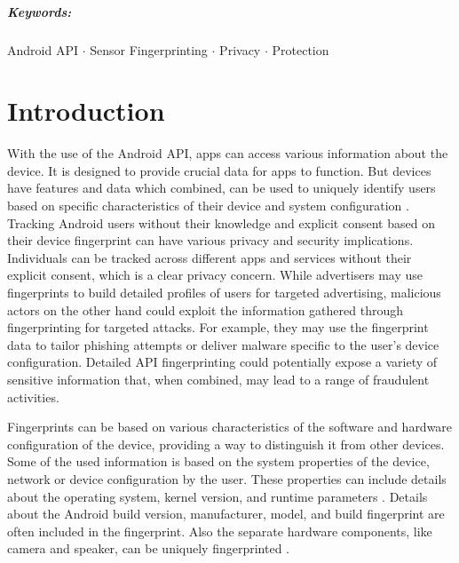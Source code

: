 \documentclass[11pt,
  oneside,openany,    %
]{scrreprt}
\begin{document}
\paragraph{Keywords:}
Android API $\cdot$
Sensor Fingerprinting $\cdot$
Privacy $\cdot$
Protection

\cleardoublepage

\chapter{Introduction}
\label{chap:introduction}

With the use of the Android API, apps can access various information about the device.
It is designed to provide crucial data for apps to function.
But devices have features and data which combined, can be used to uniquely identify users based on specific characteristics of their device and system configuration \cite{DBLP:conf/IEEEares/PalfingerP20}.
Tracking Android users without their knowledge and explicit consent based on their device fingerprint can have various privacy and security implications. 
Individuals can be tracked across different apps and services without their explicit consent, which is a clear privacy concern.
While advertisers may use fingerprints to build detailed profiles of users for targeted advertising, malicious actors on the other hand could exploit the information gathered through fingerprinting for targeted attacks. 
For example, they may use the fingerprint data to tailor phishing attempts or deliver malware specific to the user's device configuration.
Detailed API fingerprinting could potentially expose a variety of sensitive information that, when combined, may lead to a range of fraudulent activities.

Fingerprints can be based on various characteristics of the software and hardware configuration of the device, providing a way to distinguish it from other devices.
Some of the used information is based on the system properties of the device, network or device configuration by the user. 
These properties can include details about the operating system, kernel version, and runtime parameters \cite{DBLP:journals/access/WuWWLY16}.
Details about the Android build version, manufacturer, model, and build fingerprint are often included in the fingerprint. 
Also the separate hardware components, like camera and speaker, can be uniquely fingerprinted \cite{DBLP:journals/tifs/Li10, DBLP:journals/popets/DasBC18}.
\end{document}
